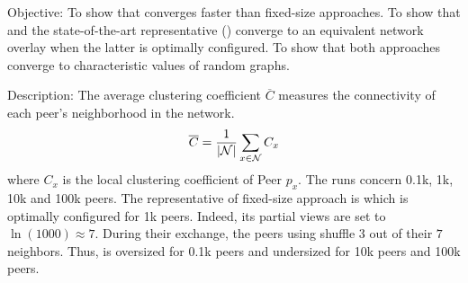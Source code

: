 \begin{asparadesc}
\item[Objective:] To show that \SPRAY{} converges faster than fixed-size
  approaches. To show that \SPRAY{} and the state-of-the-art representative
  (\CYCLON{}) converge to an equivalent network overlay when the latter is
  optimally configured. To show that both approaches converge to characteristic
  values of random graphs.
\item[Description:] The average clustering coefficient $\overline{C}$ measures
  the connectivity of each peer's neighborhood in the network.
  \begin{equation}
    \overline{C} = {1\over |\mathcal{N}|}\sum\limits_{x\in\mathcal{N}}C_x
  \end{equation}
  where $C_x$ is the local clustering coefficient of Peer $p_x$.  The runs
  concern 0.1k, 1k, 10k and 100k peers. The representative of fixed-size
  approach is \CYCLON{} which is optimally configured for 1k peers. Indeed, its
  partial views are set to $\ln(1000)\approx 7$. During their exchange, the
  peers using \CYCLON{} shuffle $3$ out of their $7$ neighbors. Thus, \CYCLON{}
  is oversized for 0.1k peers and undersized for 10k peers and 100k peers.



\end{asparadesc}
